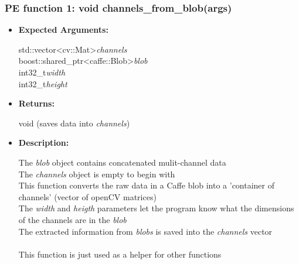 \documentclass{scrreprt}
\begin{document}
\subsubsection{PE function 1: void channels\_from\_blob(args)}
\begin{itemize}
    \item \textbf{Expected Arguments:}

    std::vector\textless cv::Mat\textgreater\quad\textit{channels}
    \\
    boost::shared\_ptr\textless caffe::Blob\textgreater\quad\textit{blob}
    \\
    int32\_t\quad\textit{width}
    \\
    int32\_t\quad\textit{height}

    \item \textbf{Returns:}

    void (saves data into \textit{channels})

    \item \textbf{Description:}

    The \textit{blob} object contains concatenated mulit-channel data
    \\
    The \textit{channels} object is empty to begin with
    \\
    This function converts the raw data in a Caffe blob into a 'container of channels' (vector of openCV matrices)
    \\
    The \textit{width} and \textit{heigth} parameters let the program know what the dimensions of the channels are in the \textit{blob}
    \\
    The extracted information from \textit{blobs} is saved into the \textit{channels} vector
    \\\\
    This function is just used as a helper for other functions
\end{itemize}
\end{document}
